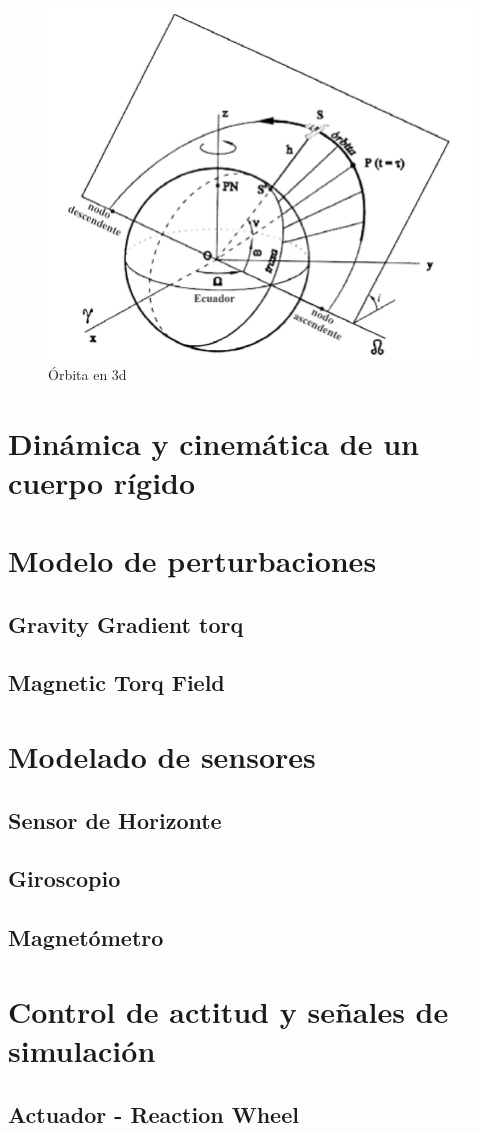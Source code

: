\begin{figure}[!htpb]
	\includegraphics[width=\linewidth]{./Figures/orbit3dplot.png}	
	\caption{Órbita en 3d}
	\label{fig:ellipse}
\end{figure}



\section{Dinámica y cinemática de un cuerpo rígido}



\section{Modelo de perturbaciones}
	\subsection{Gravity Gradient torq}
	\subsection{Magnetic Torq Field}
	

\section{Modelado de sensores}
\subsection{Sensor de Horizonte}
\subsection{Giroscopio}
\subsection{Magnetómetro}


\section{Control de actitud y señales de simulación}


\subsection{Actuador - Reaction Wheel}







